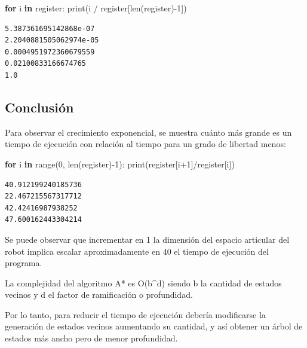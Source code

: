 \documentclass[
]{article}
\newenvironment{Shaded}{}{}
\newcommand{\BuiltInTok}[1]{#1}
\newcommand{\ControlFlowTok}[1]{\textcolor[rgb]{0.00,0.44,0.13}{\textbf{#1}}}
\newcommand{\DecValTok}[1]{\textcolor[rgb]{0.25,0.63,0.44}{#1}}
\newcommand{\KeywordTok}[1]{\textcolor[rgb]{0.00,0.44,0.13}{\textbf{#1}}}
\newcommand{\NormalTok}[1]{#1}
\newcommand{\OperatorTok}[1]{\textcolor[rgb]{0.40,0.40,0.40}{#1}}
\begin{document}
\begin{Shaded}
\begin{Highlighting}[]
\ControlFlowTok{for}\NormalTok{ i }\KeywordTok{in}\NormalTok{ register:}
    \BuiltInTok{print}\NormalTok{(i }\OperatorTok{/}\NormalTok{ register[}\BuiltInTok{len}\NormalTok{(register)}\OperatorTok{-}\DecValTok{1}\NormalTok{])}
\end{Highlighting}
\end{Shaded}

\begin{verbatim}
5.387361695142868e-07
2.2040881505062974e-05
0.0004951972360679559
0.02100833166674765
1.0
\end{verbatim}

\hypertarget{conclusiuxf3n}{%
\subsection{Conclusión}\label{conclusiuxf3n}}

Para observar el crecimiento exponencial, se muestra cuánto más grande
es un tiempo de ejecución con relación al tiempo para un grado de
libertad menos:

\begin{Shaded}
\begin{Highlighting}[]
\ControlFlowTok{for}\NormalTok{ i }\KeywordTok{in} \BuiltInTok{range}\NormalTok{(}\DecValTok{0}\NormalTok{, }\BuiltInTok{len}\NormalTok{(register)}\OperatorTok{-}\DecValTok{1}\NormalTok{):}
    \BuiltInTok{print}\NormalTok{(register[i}\OperatorTok{+}\DecValTok{1}\NormalTok{]}\OperatorTok{/}\NormalTok{register[i])}
\end{Highlighting}
\end{Shaded}

\begin{verbatim}
40.912199240185736
22.467215567317712
42.42416987938252
47.600162443304214
\end{verbatim}

Se puede observar que incrementar en 1 la dimensión del espacio
articular del robot implica escalar aproximadamente en 40 el tiempo de
ejecución del programa.

La complejidad del algoritmo A* es O(b\^{}d) siendo b la cantidad de
estados vecinos y d el factor de ramificación o profundidad.

Por lo tanto, para reducir el tiempo de ejecución debería modificarse la
generación de estados vecinos aumentando su cantidad, y así obtener un
árbol de estados más ancho pero de menor profundidad.
\end{document}
